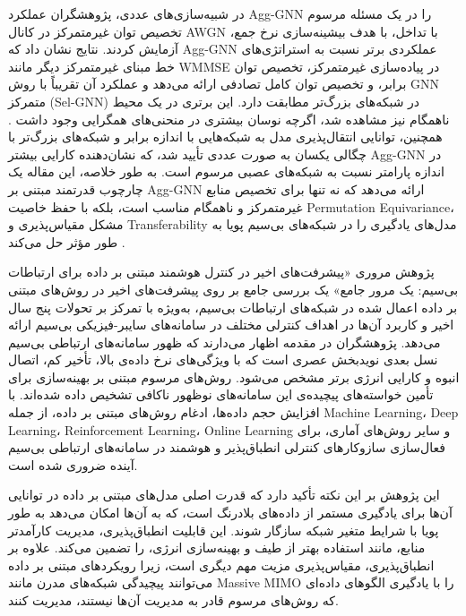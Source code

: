    در شبیه‌سازی‌های عددی، پژوهشگران عملکرد 
\gls{Agg-GNN}
  را در یک مسئله مرسوم تخصیص توان غیرمتمرکز در کانال 
\gls{AWGN}
   با تداخل، با هدف بیشینه‌سازی نرخ جمع، آزمایش کردند. نتایج نشان داد که 
\gls{Agg-GNN}
   عملکردی برتر نسبت به استراتژی‌های خط مبنای غیرمتمرکز دیگر مانند 
\gls{WMMSE}
    در پیاده‌سازی غیرمتمرکز، تخصیص توان برابر، و تخصیص توان کامل تصادفی ارائه می‌دهد و عملکرد آن تقریباً با روش 
\gls{GNN}
     متمرکز (Sel-GNN) در شبکه‌های بزرگ‌تر مطابقت دارد. این برتری در یک محیط ناهمگام نیز مشاهده شد، اگرچه نوسان بیشتری در منحنی‌های همگرایی وجود داشت . همچنین، توانایی انتقال‌پذیری مدل به شبکه‌هایی با اندازه برابر و شبکه‌های بزرگ‌تر با چگالی یکسان به صورت عددی تأیید شد، که نشان‌دهنده کارایی بیشتر 
\gls{Agg-GNN}
      در اندازه پارامتر نسبت به شبکه‌های عصبی مرسوم است.
به طور خلاصه، این مقاله یک چارچوب قدرتمند مبتنی بر 
\gls{Agg-GNN}
 ارائه می‌دهد که نه تنها برای تخصیص منابع غیرمتمرکز و ناهمگام مناسب است، بلکه با حفظ خاصیت 
\gls{Permutation Equivariance}،
  مشکل مقیاس‌پذیری و 
\gls{Transferability}
  مدل‌های یادگیری را در شبکه‌های بی‌سیم پویا به طور مؤثر حل می‌کند
\cite{LearningDecentralize}.
	
پژوهش مروری «پیشرفت‌های اخیر در کنترل هوشمند مبتنی بر داده برای ارتباطات بی‌سیم: یک مرور جامع» یک بررسی جامع بر روی پیشرفت‌های اخیر در روش‌های مبتنی بر داده اعمال شده در شبکه‌های ارتباطات بی‌سیم، به‌ویژه با تمرکز بر تحولات پنج سال اخیر و کاربرد آن‌ها در اهداف کنترلی مختلف در سامانه‌های سایبر-فیزیکی بی‌سیم ارائه می‌دهد.
پژوهشگران در مقدمه اظهار می‌دارند که ظهور سامانه‌های ارتباطی بی‌سیم نسل بعدی نویدبخش عصری است که با ویژگی‌های نرخ داده‌ی بالا، تأخیر کم، اتصال انبوه و کارایی انرژی برتر مشخص می‌شود. روش‌های مرسوم مبتنی بر بهینه‌سازی برای تأمین خواسته‌های پیچیده‌ی این سامانه‌های نوظهور ناکافی تشخیص داده شده‌اند. با افزایش حجم داده‌ها، ادغام روش‌های مبتنی بر داده، از جمله 
\gls{Machine Learning}، 
\gls{Deep Learning}، 
\gls{Reinforcement Learning}،
\gls{Online Learning}
  و سایر روش‌های آماری، برای فعال‌سازی سازوکار‌های کنترلی انطباق‌پذیر و هوشمند در سامانه‌های ارتباطی بی‌سیم آینده ضروری شده است.
  
این پژوهش بر این نکته تأکید دارد که قدرت اصلی مدل‌های مبتنی بر داده در توانایی آن‌ها برای یادگیری مستمر از داده‌های بلادرنگ است، که به آن‌ها امکان می‌دهد به طور پویا با شرایط متغیر شبکه سازگار شوند. این قابلیت انطباق‌پذیری، مدیریت کارآمدتر منابع، مانند استفاده بهتر از طیف و بهینه‌سازی انرژی، را تضمین می‌کند. علاوه بر انطباق‌پذیری، مقیاس‌پذیری مزیت مهم دیگری است، زیرا رویکردهای مبتنی بر داده می‌توانند پیچیدگی شبکه‌های مدرن مانند Massive MIMO را با یادگیری الگوهای داده‌ای که روش‌های مرسوم قادر به مدیریت آن‌ها نیستند، مدیریت کنند.

